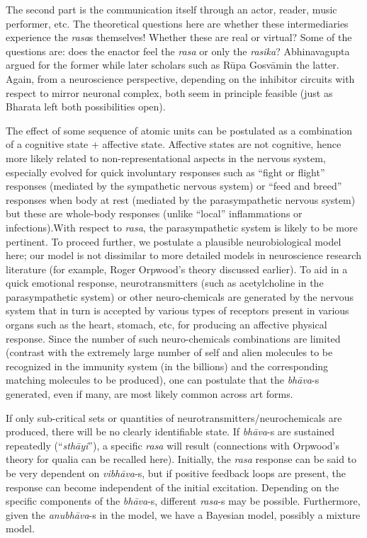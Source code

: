The second part is the communication itself through an actor, reader, music performer, etc. The theoretical questions here are whether these intermediaries experience the \textsl{rasa}s themselves! Whether these are real or virtual? Some of the questions are: does the enactor feel the \textsl{rasa} or only the \textsl{rasika}? Abhinavagupta argued for the former while later scholars such as Rūpa Gosvāmin the latter. Again, from a neuroscience perspective, depending on the inhibitor circuits with respect to mirror neuronal complex, both seem in principle feasible (just as Bharata left both possibilities open).

The effect of some sequence of atomic units can be postulated as a combination of a cognitive state + affective state. Affective states are not cognitive, hence more likely related to non-representational aspects in the nervous system, especially evolved for quick involuntary responses such as “fight or flight” responses (mediated by the sympathetic nervous system) or “feed and breed” responses when body at rest (mediated by the parasympathetic nervous system) but these are whole-body responses (unlike “local” inflammations or infections).\break With respect to \textsl{rasa}, the parasympathetic system is likely to be more pertinent. To proceed further, we postulate a plausible neurobiological model here; our model is not dissimilar to more detailed models in neuroscience research literature (for example, Roger Orpwood’s theory discussed earlier). To aid in a quick emotional response, neurotransmitters (such as acetylcholine in the parasympathetic system) or other neuro-chemicals are generated by the nervous system that in turn is accepted by various types of receptors present in various organs such as the heart, stomach, etc, for producing an affective physical response. Since the number of such neuro-chemicals combinations are limited (contrast with the extremely large number of self and alien molecules to be recognized in the immunity system (in the billions) and the corresponding matching molecules to be produced), one can postulate that the \textsl{bhāva}-s generated, even if many, are most likely common across art forms. 

If only sub-critical sets or quantities of neurotransmitters/neuro\-chemicals are produced, there will be no clearly identifiable state. If \textsl{bhāva}-s are sustained repeatedly (“\textsl{sthāyi}”), a specific \textsl{rasa} will result (connections with Orpwood’s theory for qualia can be recalled here). Initially, the \textsl{rasa} response can be said to be very dependent on \textsl{vibhāva}-s, but if positive feedback loops are present, the response can become independent of the initial excitation. Depending on the specific components of the \textsl{bhāva}-s, different \textsl{rasa}-s may be possible. Furthermore, given the \textsl{anubhāva}-s in the model, we have a Bayesian model, possibly a mixture model.

